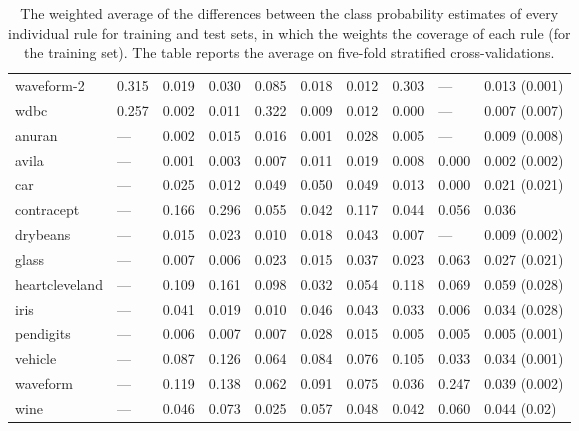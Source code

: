\begin{table}[ht]
\begin{tabular}{l|llllllll|l}
  waveform-2 & 0.315 & 0.019 & 0.030 & 0.085 & 0.018 & 0.012 & 0.303 & --- & 0.013 \tiny{(0.001)} \\ 
  wdbc & 0.257 & 0.002 & 0.011 & 0.322 & 0.009 & 0.012 & 0.000 & --- & 0.007 \tiny{(0.007)} \\ 
  anuran & --- & 0.002 & 0.015 & 0.016 & 0.001 & 0.028 & 0.005 & --- & 0.009 \tiny{(0.008)} \\ 
  avila & --- & 0.001 & 0.003 & 0.007 & 0.011 & 0.019 & 0.008 & 0.000 & 0.002 \tiny{(0.002)} \\ 
  car & --- & 0.025 & 0.012 & 0.049 & 0.050 & 0.049 & 0.013 & 0.000 & 0.021 \tiny{(0.021)} \\ 
  contracept & --- & 0.166 & 0.296 & 0.055 & 0.042 & 0.117 & 0.044 & 0.056 & 0.036 \\ 
  drybeans & --- & 0.015 & 0.023 & 0.010 & 0.018 & 0.043 & 0.007 & --- & 0.009 \tiny{(0.002)} \\ 
  glass & --- & 0.007 & 0.006 & 0.023 & 0.015 & 0.037 & 0.023 & 0.063 & 0.027 \tiny{(0.021)} \\ 
  heartcleveland & --- & 0.109 & 0.161 & 0.098 & 0.032 & 0.054 & 0.118 & 0.069 & 0.059 \tiny{(0.028)} \\ 
  iris & --- & 0.041 & 0.019 & 0.010 & 0.046 & 0.043 & 0.033 & 0.006 & 0.034 \tiny{(0.028)} \\ 
  pendigits & --- & 0.006 & 0.007 & 0.007 & 0.028 & 0.015 & 0.005 & 0.005 & 0.005 \tiny{(0.001)} \\ 
  vehicle & --- & 0.087 & 0.126 & 0.064 & 0.084 & 0.076 & 0.105 & 0.033 & 0.034 \tiny{(0.001)} \\ 
  waveform & --- & 0.119 & 0.138 & 0.062 & 0.091 & 0.075 & 0.036 & 0.247 & 0.039 \tiny{(0.002)} \\ 
  wine & --- & 0.046 & 0.073 & 0.025 & 0.057 & 0.048 & 0.042 & 0.060 & 0.044 \tiny{(0.02)} \\ 
   \hline
\end{tabular}
\caption{The weighted average of the differences between the class probability estimates of every individual rule for training and test sets, in which the weights the coverage of each rule (for the training set). The table reports the average on five-fold stratified cross-validations.} \label{table:train_test_diff}
\end{table}